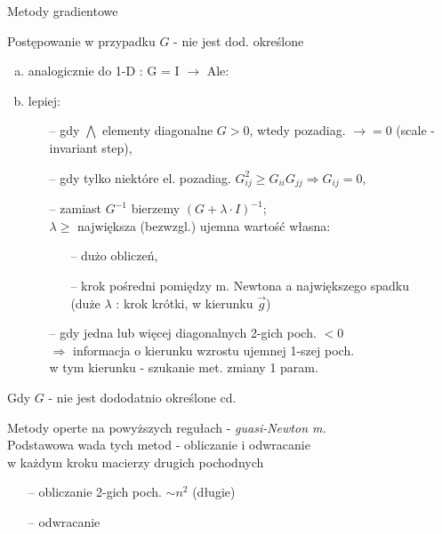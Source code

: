   \begin{frame}{Metody gradientowe}

 	\begin{block}{Postępowanie w przypadku $G$ - nie jest dod. określone}
 	   \begin{enumerate}[a)]
 	   		\item analogicznie do 1-D : G = I $\rightarrow$ Ale:
 	   		\item lepiej:
 	   		\begin{itemize}
 	   			\item[--] gdy $\bigwedge$ elementy diagonalne $G > 0$, wtedy pozadiag. $\rightarrow = 0$ (scale - invariant step),
 	   			\item[--] gdy tylko niektóre el. pozadiag. $G_{ij}^2 \geq G_{ii}G_{jj} \Rightarrow G_{ij} = 0$,
 	   			\item[--] zamiast $G^{-1}$ bierzemy $(G + \lambda \cdot I)^{-1}$;
 	   			\\ $\lambda \geq$ największa (bezwzgl.) ujemna wartość własna:
 	   			\begin{itemize}
 	   				\item[--] dużo obliczeń,
 	   				\item[--] krok pośredni pomiędzy m. Newtona a największego spadku
 	   				\\(duże $\lambda$ : krok krótki, w kierunku $\vec{g}$)
 	   			\end{itemize}
 	   			\item[--] gdy jedna lub więcej diagonalnych 2-gich poch. $< 0$
 	   			\\ $\Rightarrow$ informacja o kierunku wzrostu ujemnej 1-szej poch.
 	   			\\w tym kierunku - szukanie met. zmiany 1 param.
 	   		\end{itemize}
 	   \end{enumerate}
 	\end{block}

  \end{frame}

  \begin{frame}{Gdy $G$ - nie jest dododatnio określone cd.}

 	\begin{block}{}
 	Metody operte na powyższych regułach - \emph{guasi-Newton m.}
 	\medskip
 	\\Podstawowa wada tych metod - obliczanie i odwracanie
 	\\w każdym kroku macierzy drugich pochodnych
 	\smallskip
 	   	\begin{itemize}
 	   		\item[--] obliczanie 2-gich poch. $\sim n^2$ (długie)
 	   		\item[--] odwracanie
 	   	\end{itemize}
 	\end{block}

  \end{frame}

